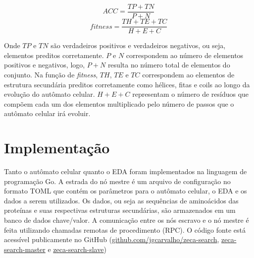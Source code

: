 \begin{equation}
ACC = \frac{TP + TN}{P + N}
\end{equation}
\begin{equation}
fitness =  \frac{TH + TE + TC}{H + E + C}
\end{equation}

Onde $TP$ e $TN$ são verdadeiros positivos e verdadeiros negativos, ou seja, elementos preditos corretamente. $P$ e $N$ correspondem ao número de elementos positivos e negativos, logo, $P+N$ resulta no número total de elementos do conjunto. Na função de \textit{fitness}, $TH$, $TE$ e $TC$ correspondem ao elementos de estrutura secundária preditos corretamente como hélices, fitas e coils ao longo da evolução do autômato celular. $H+E+C$ representam o número de resíduos que compõem cada um dos elementos multiplicado pelo número de passos que o autômato celular irá evoluir.



\section{Implementação}

Tanto o autômato celular quanto o EDA foram implementados na linguagem de programação Go. A estrada do nó mestre é um arquivo de configuração no formato TOML que contém os parâmetros para o autômato celular, o EDA e os dados a serem utilizados. Os dados, ou seja as sequências de aminoácidos das proteínas e suas respectivas estruturas secundárias, são armazenados em um banco de dados chave/valor. A comunicação entre os nós escravo e o nó mestre é feita utilizando chamadas remotas de procedimento (RPC). O código fonte está acessível publicamente no GitHub (\href{https://github.com/jgcarvalho/zeca-search}{github.com/jgcarvalho/zeca-search}, \href{https://github.com/jgcarvalho/zeca-search-master}{zeca-search-master} e \href{https://github.com/jgcarvalho/zeca-search-slave}{zeca-search-slave})  

